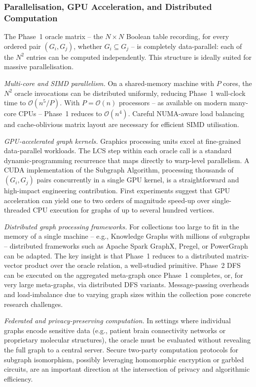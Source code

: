 ﻿\documentclass[12pt,a4paper]{article}
\theoremstyle{plain}
\theoremstyle{definition}
\theoremstyle{remark}
\begin{document}
	\subsubsection*{Parallelisation, GPU Acceleration, and Distributed Computation}

	The Phase~1 oracle matrix -- the $N \times N$ Boolean table recording, for
	every ordered pair $(G_i, G_j)$, whether $G_i \subseteq G_j$ -- is
	completely data-parallel: each of the $N^2$ entries can be computed
	independently.  This structure is ideally suited for massive parallelisation.

	\emph{Multi-core and SIMD parallelism.}  On a shared-memory machine with $P$
	cores, the $N^2$ oracle invocations can be distributed uniformly, reducing
	Phase~1 wall-clock time to $\mathcal{O}(n^5/P)$.  With $P = \mathcal{O}(n)$
	processors -- as available on modern many-core CPUs -- Phase~1 reduces to
	$\mathcal{O}(n^4)$.  Careful NUMA-aware load balancing and cache-oblivious
	matrix layout are necessary for efficient SIMD utilisation.

	\emph{GPU-accelerated graph kernels.}  Graphics processing units excel at
	fine-grained data-parallel workloads.  The LCS step within each oracle call
	is a standard dynamic-program\-ming recurrence that maps directly to warp-level
	parallelism.  A CUDA implementation of the Subgraph Algorithm, processing
	thousands of $(G_i, G_j)$ pairs concurrently in a single GPU kernel, is a
	straightforward and high-impact engineering contribution.  First experiments
	suggest that GPU acceleration can yield one to two orders of magnitude
	speed-up over single-threaded CPU execution for graphs of up to several
	hundred vertices.

	\emph{Distributed graph processing frameworks.}  For collections too large
	to fit in the memory of a single machine -- e.g., Knowledge Graphs with
	millions of subgraphs -- distributed frameworks such as Apache Spark
	GraphX, Pregel, or PowerGraph can be adapted.  The key insight is that
	Phase~1 reduces to a distributed matrix-vector product over the oracle
	relation, a well-studied primitive.  Phase~2 DFS can be executed on the
	aggregated meta-graph once Phase~1 completes, or, for very large
	meta-graphs, via distributed DFS variants.  Message-passing overheads
	and load-imbalance due to varying graph sizes within the collection pose
	concrete research challenges.

	\emph{Federated and privacy-preserving computation.}  In settings where
	individual graphs encode sensitive data (e.g., patient brain connectivity
	networks or proprietary molecular structures), the oracle must be evaluated
	without revealing the full graph to a central server.  Secure two-party
	computation protocols for subgraph isomorphism, possibly leveraging
	homomorphic encryption or garbled circuits, are an important direction
	at the intersection of privacy and algorithmic efficiency.
\end{document}

